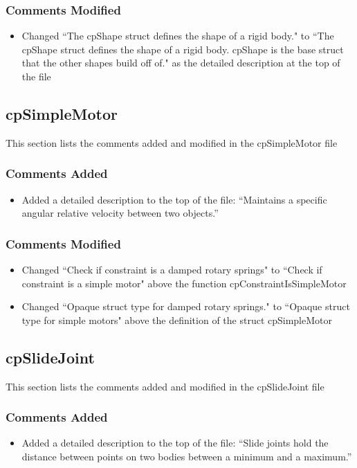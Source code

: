 \documentclass[12pt]{article}
\begin{document}
\subsubsection{Comments Modified}
\begin{itemize}
\item Changed ``The cpShape struct defines the shape of a rigid body."  to 
``The cpShape struct defines the shape of a rigid body. cpShape is the base  struct that the other shapes build off of." 
as the detailed description at the top of the file
\end{itemize}

\subsection{cpSimpleMotor} 
This section lists the comments added and modified  in the cpSimpleMotor file

\subsubsection{Comments Added}
\begin{itemize}
\item Added a detailed description to the top of the file: ``Maintains a specific angular relative velocity between two objects.''
\end{itemize}

\subsubsection{Comments Modified}
\begin{itemize}
\item Changed ``Check if constraint is a damped rotary springs" to ``Check if constraint is a simple motor" above the function cpConstraintIsSimpleMotor
\item Changed ``Opaque struct type for damped rotary springs." to ``Opaque struct type for simple motors" above the definition of the struct cpSimpleMotor
\end{itemize}


\subsection{cpSlideJoint} 
This section lists the comments added and modified  in the cpSlideJoint file

\subsubsection{Comments Added}
\begin{itemize}
\item Added a detailed description to the top of the file: ``Slide joints hold the distance between points on two bodies between a minimum and a maximum.''
\end{itemize}
\end{document}
